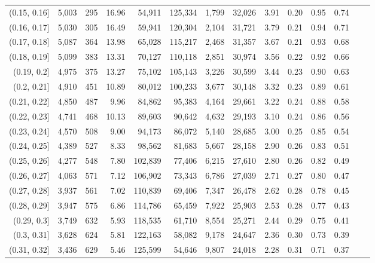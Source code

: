 \begin{tabular}{rrrrrrrrrrrrrr}
(0.15, 0.16]   &  5,003 &  295 &   16.96 &   54,911 &  125,334 &   1,799 &  32,026 &  3.91 &  0.20 &  0.95 &      0.74 \\
(0.16, 0.17]   &  5,030 &  305 &   16.49 &   59,941 &  120,304 &   2,104 &  31,721 &  3.79 &  0.21 &  0.94 &      0.71 \\
(0.17, 0.18]   &  5,087 &  364 &   13.98 &   65,028 &  115,217 &   2,468 &  31,357 &  3.67 &  0.21 &  0.93 &      0.68 \\
(0.18, 0.19]   &  5,099 &  383 &   13.31 &   70,127 &  110,118 &   2,851 &  30,974 &  3.56 &  0.22 &  0.92 &      0.66 \\
(0.19, 0.2]    &  4,975 &  375 &   13.27 &   75,102 &  105,143 &   3,226 &  30,599 &  3.44 &  0.23 &  0.90 &      0.63 \\
(0.2, 0.21]    &  4,910 &  451 &   10.89 &   80,012 &  100,233 &   3,677 &  30,148 &  3.32 &  0.23 &  0.89 &      0.61 \\
(0.21, 0.22]   &  4,850 &  487 &    9.96 &   84,862 &   95,383 &   4,164 &  29,661 &  3.22 &  0.24 &  0.88 &      0.58 \\
(0.22, 0.23]   &  4,741 &  468 &   10.13 &   89,603 &   90,642 &   4,632 &  29,193 &  3.10 &  0.24 &  0.86 &      0.56 \\
(0.23, 0.24]   &  4,570 &  508 &    9.00 &   94,173 &   86,072 &   5,140 &  28,685 &  3.00 &  0.25 &  0.85 &      0.54 \\
(0.24, 0.25]   &  4,389 &  527 &    8.33 &   98,562 &   81,683 &   5,667 &  28,158 &  2.90 &  0.26 &  0.83 &      0.51 \\
(0.25, 0.26]   &  4,277 &  548 &    7.80 &  102,839 &   77,406 &   6,215 &  27,610 &  2.80 &  0.26 &  0.82 &      0.49 \\
(0.26, 0.27]   &  4,063 &  571 &    7.12 &  106,902 &   73,343 &   6,786 &  27,039 &  2.71 &  0.27 &  0.80 &      0.47 \\
(0.27, 0.28]   &  3,937 &  561 &    7.02 &  110,839 &   69,406 &   7,347 &  26,478 &  2.62 &  0.28 &  0.78 &      0.45 \\
(0.28, 0.29]   &  3,947 &  575 &    6.86 &  114,786 &   65,459 &   7,922 &  25,903 &  2.53 &  0.28 &  0.77 &      0.43 \\
(0.29, 0.3]    &  3,749 &  632 &    5.93 &  118,535 &   61,710 &   8,554 &  25,271 &  2.44 &  0.29 &  0.75 &      0.41 \\
(0.3, 0.31]    &  3,628 &  624 &    5.81 &  122,163 &   58,082 &   9,178 &  24,647 &  2.36 &  0.30 &  0.73 &      0.39 \\
(0.31, 0.32]   &  3,436 &  629 &    5.46 &  125,599 &   54,646 &   9,807 &  24,018 &  2.28 &  0.31 &  0.71 &      0.37 \\

\end{tabular}

